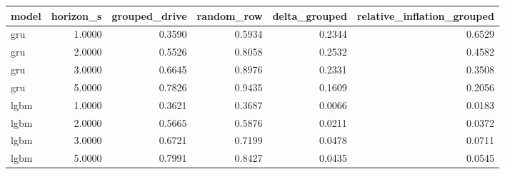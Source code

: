 \begin{tabular}{lrrrrr}
\toprule
model & horizon\_s & grouped\_drive & random\_row & delta\_grouped & relative\_inflation\_grouped \\
\midrule
gru & 1.0000 & 0.3590 & 0.5934 & 0.2344 & 0.6529 \\
gru & 2.0000 & 0.5526 & 0.8058 & 0.2532 & 0.4582 \\
gru & 3.0000 & 0.6645 & 0.8976 & 0.2331 & 0.3508 \\
gru & 5.0000 & 0.7826 & 0.9435 & 0.1609 & 0.2056 \\
lgbm & 1.0000 & 0.3621 & 0.3687 & 0.0066 & 0.0183 \\
lgbm & 2.0000 & 0.5665 & 0.5876 & 0.0211 & 0.0372 \\
lgbm & 3.0000 & 0.6721 & 0.7199 & 0.0478 & 0.0711 \\
lgbm & 5.0000 & 0.7991 & 0.8427 & 0.0435 & 0.0545 \\
\bottomrule
\end{tabular}
